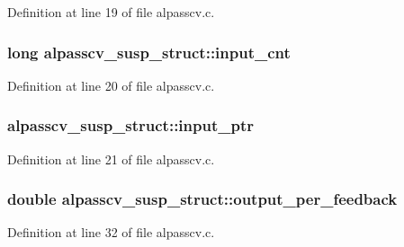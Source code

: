 Definition at line 19 of file alpasscv.\+c.

\subsubsection[{\texorpdfstring{input\+\_\+cnt}{input_cnt}}]{\setlength{\rightskip}{0pt plus 5cm}long alpasscv\+\_\+susp\+\_\+struct\+::input\+\_\+cnt}\hypertarget{structalpasscv__susp__struct_a649368ce5cc28a2ed696ba4b253edab2}{}\label{structalpasscv__susp__struct_a649368ce5cc28a2ed696ba4b253edab2}


Definition at line 20 of file alpasscv.\+c.

\subsubsection[{\texorpdfstring{input\+\_\+ptr}{input_ptr}}]{ alpasscv\+\_\+susp\+\_\+struct\+::input\+\_\+ptr}\hypertarget{structalpasscv__susp__struct_a26002f981b9d848f5775d6131a5b9ae6}{}\label{structalpasscv__susp__struct_a26002f981b9d848f5775d6131a5b9ae6}


Definition at line 21 of file alpasscv.\+c.

\subsubsection[{\texorpdfstring{output\+\_\+per\+\_\+feedback}{output_per_feedback}}]{\setlength{\rightskip}{0pt plus 5cm}double alpasscv\+\_\+susp\+\_\+struct\+::output\+\_\+per\+\_\+feedback}\hypertarget{structalpasscv__susp__struct_a349757a5ff5165bd64fa714b1a5547ce}{}\label{structalpasscv__susp__struct_a349757a5ff5165bd64fa714b1a5547ce}


Definition at line 32 of file alpasscv.\+c.

